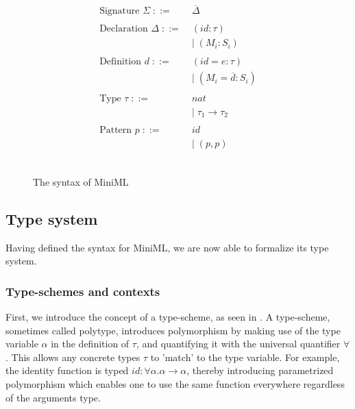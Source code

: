 \documentclass[10pt,a4paper,master=cws, masteroption=ai,english,inputenc=utf8]{kulemt}
\begin{document}
\begin{figure}[!htb]
\begin{align*}
\begin{aligned}
\text{Signature } \Sigma \; ::=\; & \overline{\Delta}\\
\\
\text{Declaration } \Delta \; ::=\; & (\mathit{id}:\tau)\\
& | \; (\mathit{M_{i}}:S_{i})\\
\\
\text{Definition } d \; ::= \; &(\mathit{id}=e:\tau)\\
& | \; (\mathit{M_{i}} = \overline{d} : S_{i}) \\
\\
\text{Type }\tau \; ::= \; &nat \\
&| \; \tau_{1} \rightarrow \tau_{2} \\
\\
\text{Pattern }p \; ::= \; & \mathit{id} \\
&| \; (p,p)\\
\\
\\
\end{aligned}
\end{align*}
\caption{The syntax of MiniML}
\label{fig:Syntax}
\end{figure}



\subsection{Type system}
Having defined the syntax for \mbox{MiniML}, we are now able to formalize its type system.

\subsubsection{Type-schemes and contexts}
First, we introduce the concept of a type-scheme, as seen in . A type-scheme, sometimes called polytype, introduces polymorphism by making use of the type variable $\alpha$ in the definition of $\tau$, and quantifying it with the universal quantifier $\forall$. This allows any concrete types $\tau$ to 'match' to the type variable. For example, the identity function  is typed $id:\forall \alpha. \alpha \rightarrow \alpha$, thereby introducing parametrized polymorphism which enables one to use the same  function everywhere regardless of the arguments type.
\end{document}
